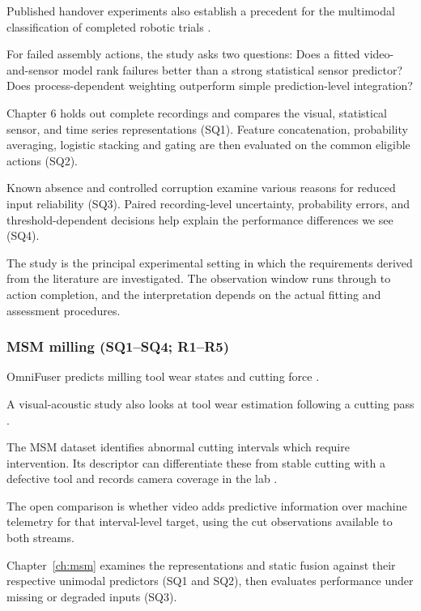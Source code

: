 Published handover experiments also establish a precedent for the multimodal classification of
completed robotic trials \parencite[Table~III]{Thoduka2024Handover}.

For failed assembly actions, the study asks two questions: Does a fitted video-and-sensor model rank
failures better than a strong statistical sensor predictor? Does process-dependent weighting
outperform simple prediction-level integration?

Chapter 6 holds out complete recordings and compares the visual, statistical sensor, and time series
representations (SQ1). Feature concatenation, probability averaging, logistic stacking and gating
are then evaluated on the common eligible actions (SQ2).

Known absence and controlled corruption examine various reasons for reduced input reliability (SQ3).
Paired recording-level uncertainty, probability errors, and threshold-dependent decisions help
explain the performance differences we see (SQ4).

The study is the principal experimental setting in which the requirements derived from the
literature are investigated. The observation window runs through to action completion, and the
interpretation depends on the actual fitting and assessment procedures.

\subsubsection*{MSM milling (SQ1--SQ4; R1--R5)}

OmniFuser predicts milling tool wear states and cutting force \parencite[PDF p.~11, Tables~IV--V]{P021}.

A visual-acoustic study also looks at tool wear estimation following a cutting pass \parencite[PDF
p.~24, Table~1]{P045}.

The MSM dataset identifies abnormal cutting intervals which require intervention. Its descriptor can
differentiate these from stable cutting with a defective tool and records camera coverage in the lab
\parencite{Kim2026MSM}.

The open comparison is whether video adds predictive information over machine telemetry for that
interval-level target, using the cut observations available to both streams.

Chapter~\ref{ch:msm} examines the representations and static fusion against their respective
unimodal predictors (SQ1 and SQ2), then evaluates performance under missing or degraded inputs
(SQ3).

